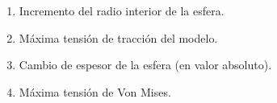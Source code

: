 \documentclass[a4paper,12pt]{article}
\begin{document}
\begin{enumerate}
\item Incremento del radio interior de la esfera.
  \begin{multicols}{4}
\columnbreak
{}
\columnbreak
{}
\columnbreak
{}
  \end{multicols}

\item Máxima tensión de tracción del modelo.
\begin{multicols}{4}
\columnbreak
{}
\columnbreak
{} %
\columnbreak
{}
  \end{multicols}
\item Cambio de espesor de la esfera (en valor absoluto).
\begin{multicols}{4}
\columnbreak
{} %
\columnbreak
{}
\columnbreak
{}
  \end{multicols}

\item Máxima tensión de Von Mises.
\begin{multicols}{4}
\columnbreak
{}
\columnbreak
{}
\columnbreak
{} %
  \end{multicols}

\end{enumerate}
\end{document}
